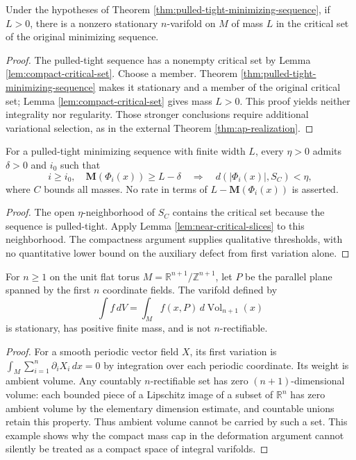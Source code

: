 \begin{corollary}\label{cor:positive-width-stationary-varifold}
Under the hypotheses of Theorem \ref{thm:pulled-tight-minimizing-sequence}, if $L>0$, there is a nonzero stationary $n$-varifold on $M$ of mass $L$ in the critical set of the original minimizing sequence.
\end{corollary}
\begin{proof}
The pulled-tight sequence has a nonempty critical set by Lemma \ref{lem:compact-critical-set}. Choose a member. Theorem \ref{thm:pulled-tight-minimizing-sequence} makes it stationary and a member of the original critical set; Lemma \ref{lem:compact-critical-set} gives mass $L>0$. This proof yields neither integrality nor regularity. Those stronger conclusions require additional variational selection, as in the external Theorem \ref{thm:ap-realization}.
\end{proof}

\begin{proposition}\label{prop:pulledtight-near-maximal-stationary}
For a pulled-tight minimizing sequence with finite width $L$, every $\eta>0$ admits $\delta>0$ and $i_0$ such that
\[
 i\geq i_0,\quad \mathbf M(\Phi_i(x))\geq L-\delta
 \quad\Longrightarrow\quad d(|\Phi_i(x)|,S_C)<\eta,
\]
where $C$ bounds all masses. No rate in terms of $L-\mathbf M(\Phi_i(x))$ is asserted.
\end{proposition}
\begin{proof}
The open $\eta$-neighborhood of $S_C$ contains the critical set because the sequence is pulled-tight. Apply Lemma \ref{lem:near-critical-slices} to this neighborhood. The compactness argument supplies qualitative thresholds, with no quantitative lower bound on the auxiliary defect from first variation alone.
\end{proof}

\begin{example}\label{ex:diffuse-stationary-flat-torus}
For $n\geq1$ on the unit flat torus $M=\mathbb R^{n+1}/\mathbb Z^{n+1}$, let $P$ be the parallel plane spanned by the first $n$ coordinate fields. The varifold defined by
\[
 \int f\,dV=\int_M f(x,P)\,d\operatorname{Vol}_{n+1}(x)
\]
is stationary, has positive finite mass, and is not $n$-rectifiable.
\end{example}
\begin{proof}
For a smooth periodic vector field $X$, its first variation is $\int_M\sum_{i=1}^n\partial_iX_i\,dx=0$ by integration over each periodic coordinate. Its weight is ambient volume. Any countably $n$-rectifiable set has zero $(n+1)$-dimensional volume: each bounded piece of a Lipschitz image of a subset of $\mathbb R^n$ has zero ambient volume by the elementary dimension estimate, and countable unions retain this property. Thus ambient volume cannot be carried by such a set. This example shows why the compact mass cap in the deformation argument cannot silently be treated as a compact space of integral varifolds.
\end{proof}

